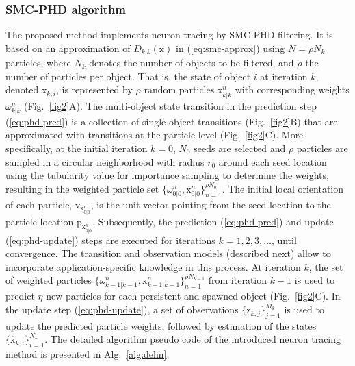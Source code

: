\subsubsection{SMC-PHD algorithm}
\label{ssec:smc-phd-rec}
The proposed method implements neuron tracing by SMC-PHD filtering. It is based on an approximation of $D_{k|k}(\mathrm{x})$ in (\ref{eq:smc-approx}) using $N=\rho N_k$ particles, where $N_k$ denotes the number of objects to be filtered, and $\rho$ the number of particles per object. That is, the state of object $i$ at iteration $k$, denoted $\mathrm{x}_{k,i}$, is represented by $\rho$ random particles $\mathrm{x}_{k|k}^{n}$ with corresponding weights $\omega_{k|k}^{n}$ (Fig.~\ref{fig2}A). The multi-object state transition in the prediction step (\ref{eq:phd-pred}) is a collection of single-object transitions (Fig.~\ref{fig2}B) that are approximated with transitions at the particle level (Fig.~\ref{fig2}C). More specifically, at the initial iteration $k=0$, $N_0$ seeds are selected and $\rho$ particles are sampled in a circular neighborhood with radius $r_0$ around each seed location using the tubularity value for importance sampling to determine the weights, resulting in the weighted particle set $\lbrace \omega_{0|0}^n, \mathrm{x}_{0|0}^n \rbrace_{n=1}^{\rho N_0}$. The initial local orientation of each particle, $\mathrm{v}_{\mathrm{x}_{0|0}^n}$, is the unit vector pointing from the seed location to the particle location $\mathrm{p}_{\mathrm{x}_{0|0}^n}$. Subsequently, the prediction (\ref{eq:phd-pred}) and update (\ref{eq:phd-update}) steps are executed for iterations $k=1,2,3,\dots$, until convergence. The transition and observation models (described next) allow to incorporate application-specific knowledge in this process. At iteration $k$, the set of weighted particles $\lbrace \omega_{k-1|k-1}^n, \mathrm{x}_{k-1|k-1}^n \rbrace_{n=1}^{\rho N_{k-1}}$ from iteration $k-1$ is used to predict $\eta$ new particles for each persistent and spawned object (Fig.~\ref{fig2}C). In the update step (\ref{eq:phd-update}), a set of observations $\lbrace \mathrm{z}_{k,j}\rbrace_{j=1}^{M_k}$ is used to update the predicted particle weights, followed by estimation of the states $\lbrace \hat{\mathrm{x}}_{k,i}\rbrace_{i=1}^{N_k}$. The detailed algorithm pseudo code of the introduced neuron tracing method is presented in Alg.~\ref{alg:delin}.
